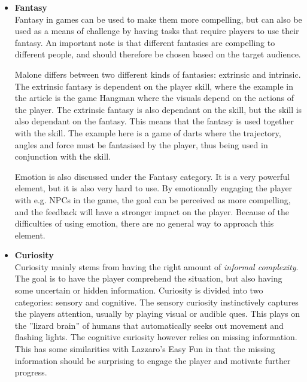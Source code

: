 \begin{itemize}
            \SPACE
            
            \item \textbf{Fantasy}\\
            Fantasy in games can be used to make them more compelling, but can also be used as a means of challenge by having tasks that require players to use their fantasy. An important note is that different fantasies are compelling to different people, and should therefore be chosen based on the target audience.
            
            Malone differs between two different kinds of fantasies: extrinsic and intrinsic. The extrinsic fantasy is dependent on the player skill, where the example in the article is the game Hangman where the visuals depend on the actions of the player. The extrinsic fantasy is also dependant on the skill, but the skill is also dependant on the fantasy. This means that the fantasy is used together with the skill. The example here is a game of darts where the trajectory, angles and force must be fantasised by the player, thus being used in conjunction with the skill.
            
            Emotion is also discussed under the Fantasy category. It is a very powerful element, but it is also very hard to use. By emotionally engaging the player with e.g. NPCs in the game, the goal can be perceived as more compelling, and the feedback will have a stronger impact on the player. Because of the difficulties of using emotion, there are no general way to approach this element.
            
            \SPACE
            
            \item \textbf{Curiosity}\\
            Curiosity mainly stems from having the right amount of \emph{informal complexity}. The goal is to have the player comprehend the situation, but also having some uncertain or hidden information. Curiosity is divided into two categories: sensory and cognitive. The sensory curiosity instinctively captures the players attention, usually by playing visual or audible ques. This plays on the ''lizard brain'' of humans that automatically seeks out movement and flashing lights. The cognitive curiosity however relies on missing information. This has some similarities with Lazzaro's Easy Fun in that the missing information should be surprising to engage the player and motivate further progress.
        \end{itemize}

